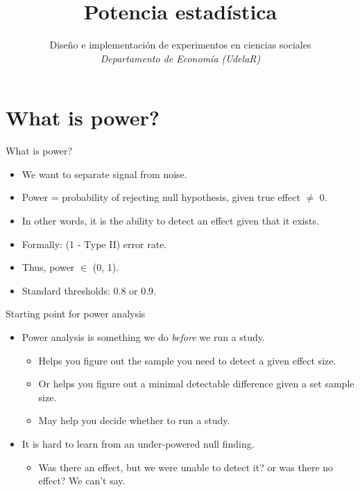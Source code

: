\documentclass[
  ignorenonframetext,
]{beamer}
\title{Potencia estadística}
\author{Diseño e implementación de experimentos en ciencias sociales\\
\emph{Departamento de Economía (UdelaR)}}
\date{}
\providecommand{\tightlist}{%
  \setlength{\itemsep}{0pt}\setlength{\parskip}{0pt}}
\begin{document}
\frame{\titlepage}

\hypertarget{what-is-power}{%
\section{What is power?}\label{what-is-power}}

\begin{frame}{What is power?}
\protect\hypertarget{what-is-power-1}{}
\begin{itemize}
\item
  We want to separate signal from noise.
\item
  Power = probability of rejecting null hypothesis, given true effect
  \(\ne\) 0.
\item
  In other words, it is the ability to detect an effect given that it
  exists.
\item
  Formally: (1 - Type II) error rate.
\item
  Thus, power \(\in\) (0, 1).
\item
  Standard thresholds: 0.8 or 0.9.
\end{itemize}
\end{frame}

\begin{frame}{Starting point for power analysis}
\protect\hypertarget{starting-point-for-power-analysis}{}
\begin{itemize}
\item
  Power analysis is something we do \emph{before} we run a study.

  \begin{itemize}
  \item
    Helps you figure out the sample you need to detect a given effect
    size.
  \item
    Or helps you figure out a minimal detectable difference given a set
    sample size.
  \item
    May help you decide whether to run a study.
  \end{itemize}
\item
  It is hard to learn from an under-powered null finding.

  \begin{itemize}
  \tightlist
  \item
    Was there an effect, but we were unable to detect it? or was there
    no effect? We can't say.
  \end{itemize}
\end{itemize}
\end{frame}
\end{document}
